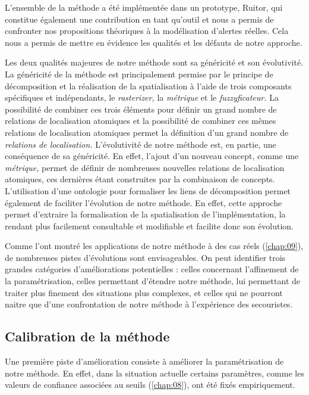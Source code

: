 L'ensemble de la méthode a été implémentée dans un prototype, Ruitor,
qui constitue également une contribution en tant qu'outil et nous a
permis de confronter nos propositions théoriques à la modélisation
d'alertes réelles. Cela nous a permis de mettre en évidence les
qualités et les défauts de notre approche.

Les deux qualités majeures de notre méthode sont sa généricité et son
évolutivité. La généricité de la méthode est principalement permise
par le principe de décomposition et la réalisation de la
spatialisation à l'aide de trois composants spécifiques et
indépendants, le \emph{rasterizer,} la \emph{métrique} et le
\emph{fuzzyficateur.} La possibilité de combiner ces trois éléments
pour définir un grand nombre de relations de localisation atomiques et
la possibilité de combiner ces mêmes relations de localisation
atomiques permet la définition d'un grand nombre de \emph{relations de
  localisation.} L'évolutivité de notre méthode est, en partie, une
conséquence de sa généricité. En effet, l'ajout d'un nouveau concept,
comme une \emph{métrique,} permet de définir de nombreuses nouvelles
relations de localisation atomiques, ces dernières étant construites
par la combinaison de concepts. L'utilisation d'une ontologie pour
formaliser les liens de décomposition permet également de faciliter
l'évolution de notre méthode. En effet, cette approche permet
d'extraire la formalisation de la spatialisation de l'implémentation,
la rendant plus facilement consultable et modifiable et facilite donc
son évolution.


Comme l'ont montré les applications de notre méthode à des cas réels
(\autoref{chap:09}), de nombreuses pistes d'évolutions sont
envisageables. On peut identifier trois grandes catégories
d'améliorations potentielles : celles concernant l'affinement de la
paramétrisation, celles permettant d'étendre notre méthode, lui
permettant de traiter plus finement des situations plus complexes, et
celles qui ne pourront naitre que d'une confrontation de notre méthode
à l'expérience des secouristes.

\subsection*{Calibration de la méthode}

Une première piste d'amélioration consiste à améliorer la
paramétrisation de notre méthode. En effet, dans la situation actuelle
certains paramètres, comme les valeurs de confiance associées au
seuils (\autoref{chap:08}), ont été fixés empiriquement.

